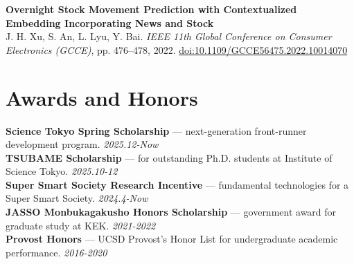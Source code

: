 \documentclass[a4paper,10pt]{article}
\begin{document}
\textbf{Overnight Stock Movement Prediction with Contextualized Embedding Incorporating News and Stock} \\
\textcolor{textgray}{J. H. Xu, S. An, L. Lyu, Y. Bai. \textit{IEEE 11th Global Conference on Consumer Electronics (GCCE)}, pp. 476--478, 2022. \href{http://dx.doi.org/10.1109/GCCE56475.2022.10014070}{doi:10.1109/GCCE56475.2022.10014070}}

\section*{Awards and Honors}
\textbf{Science Tokyo Spring Scholarship} \textcolor{textgray}{--- next-generation front-runner development program.} \hfill {\em 2025.12-Now} \\
\textbf{TSUBAME Scholarship} \textcolor{textgray}{--- for outstanding Ph.D. students at Institute of Science Tokyo.} \hfill {\em 2025.10-12} \\
\textbf{Super Smart Society Research Incentive} \textcolor{textgray}{--- fundamental technologies for a Super Smart Society.} \hfill {\em 2024.4-Now} \\
\textbf{JASSO Monbukagakusho Honors Scholarship} \textcolor{textgray}{--- government award for graduate study at KEK.} \hfill {\em 2021-2022} \\
\textbf{Provost Honors} \textcolor{textgray}{--- UCSD Provost's Honor List for undergraduate academic performance.} \hfill {\em 2016-2020}

\end{document}
